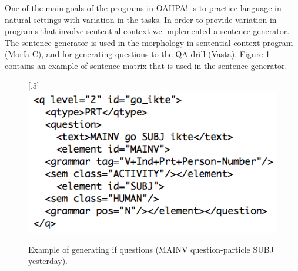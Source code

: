 \documentclass[11pt]{article}
\begin{document}
One of the main goals of the programs in OAHPA! is to practice language in natural settings with variation in the tasks. In order to provide variation in programs that involve sentential context we implemented a sentence generator. The sentence generator is used in the morphology in sentential context program (Morfa-C), and for generating questions to the QA drill (Vasta). Figure \ref{questionv} contains an example of sentence matrix that is used in the sentence generator.

\begin{figure}[htbp]
\begin{center}
\scalebox{.5}[.5]{\includegraphics{presentation/img/question_vasta2.png}}\\
\caption{Example of generating if questions (MAINV question-particle SUBJ yesterday).}
\label{questionv}
\end{center}
\end{figure}

%
\end{document}
